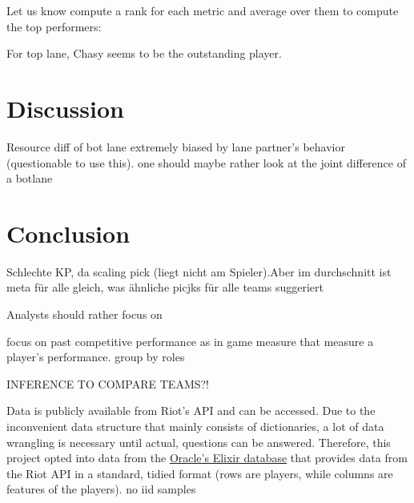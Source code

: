 \documentclass{article}
\begin{document}
Let us know compute a rank for each metric and average over them to compute the top performers:


For top lane, Chasy seems to be the outstanding player. 

\section{Discussion}
Resource diff of bot lane extremely biased by lane partner's behavior (questionable to use this). one should maybe rather look at the joint difference of a botlane


\section{Conclusion}








Schlechte KP, da scaling pick (liegt nicht am Spieler).Aber im durchschnitt ist meta für alle gleich, was ähnliche picjks für alle teams suggeriert

Analysts should rather focus on 

focus on past competitive performance as in game measure
 that measure a player's performance. 
group by roles


INFERENCE TO COMPARE TEAMS?!

 Data is publicly available from Riot's API and can be accessed. Due to the inconvenient data structure that mainly consists of dictionaries, a lot of data wrangling is necessary until actual,  questions can be answered. Therefore, this project opted into data from the \href{https://oracleselixir.com/}{Oracle's Elixir database} that provides data from the Riot API in a standard, tidied format (rows are players, while columns are features of the players). 
no iid samples



\end{document}
